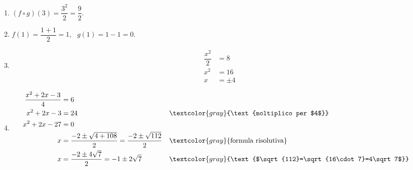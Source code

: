 \begin{question}[ID=1.3, subtitle={Composizione di funzioni con frazioni}, difficulty=media, tags={funzioni, composizione}]
\begin{explanation}
\begin{enumerate}
    \item $(f\circ g)(3)=\dfrac{3^2}{2}=\dfrac92$.
    \item $f(1)=\dfrac{1+1}{2}=1$, \ $g(1)=1-1=0$.
    \item \[\begin{aligned}
    \dfrac{x^2}{2} &= 8\\
    x^2 &= 16\\
    x &= \pm4
    \end{aligned}\]
    \item \[\begin{aligned}
    \dfrac{x^2+2x-3}{4} &= 6\\
    x^2+2x-3 &= 24 && \textcolor{gray}{\text{moltiplico per $4$}}\\
    x^2+2x-27 &= 0\\
    x &= \dfrac{-2\pm\sqrt{4+108}}{2}=\dfrac{-2\pm\sqrt{112}}{2} && \textcolor{gray}{\text{formula risolutiva}}\\
    x &= \dfrac{-2\pm4\sqrt7}{2}=-1\pm2\sqrt7 && \textcolor{gray}{\text{$\sqrt{112}=\sqrt{16\cdot7}=4\sqrt7$}}
    \end{aligned}\]
\end{enumerate}
\end{explanation}
\end{question}


